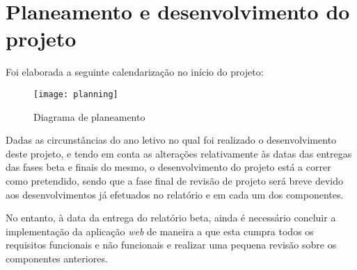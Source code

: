 \section{Planeamento e desenvolvimento do projeto} 
Foi elaborada a seguinte calendarização no início do projeto:

\begin{figure}[h]
	\centering
	\texttt{[image: planning]}
	\caption{Diagrama de planeamento}
\end{figure}

Dadas as circunstâncias do ano letivo no qual foi realizado o desenvolvimento deste projeto, e tendo em conta as alterações relativamente às datas das entregas das fases beta e finais do mesmo, o desenvolvimento do projeto está a correr como pretendido, sendo que a fase final de revisão de projeto será breve devido aos desenvolvimentos já efetuados no relatório e em cada um dos componentes. \par \medskip

No entanto, à data da entrega do relatório beta, ainda é necessário concluir a implementação da aplicação \textit{web} de maneira a que esta cumpra todos os requisitos funcionais e não funcionais e realizar uma pequena revisão sobre os componentes anteriores.